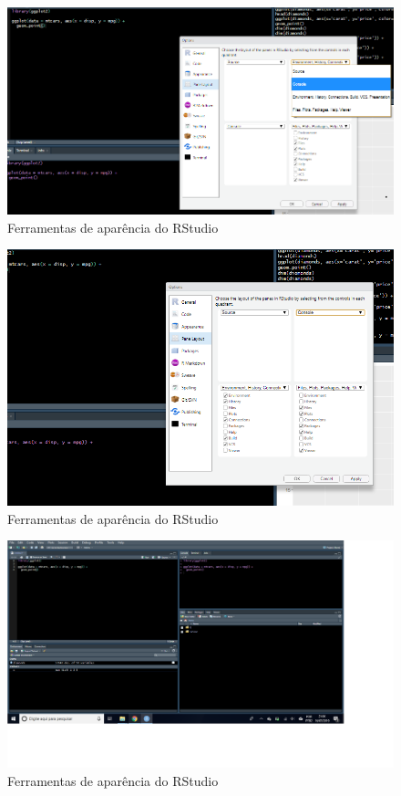 \documentclass[
]{book}
\begin{document}
\begin{figure}
\includegraphics[width=1\linewidth]{figures/rstudio4} \caption{\label{fig:rstudio4} Ferramentas de aparência do RStudio}\label{fig:telarstudio4}
\end{figure}

\begin{figure}
\includegraphics[width=1\linewidth]{figures/rstudio5} \caption{\label{fig:rstudio5} Ferramentas de aparência do RStudio}\label{fig:telarstudio5}
\end{figure}

\begin{figure}
\includegraphics[width=1\linewidth]{figures/rstudio6} \caption{\label{fig:rstudio6} Ferramentas de aparência do RStudio}\label{fig:telarstudio6}
\end{figure}
\end{document}
